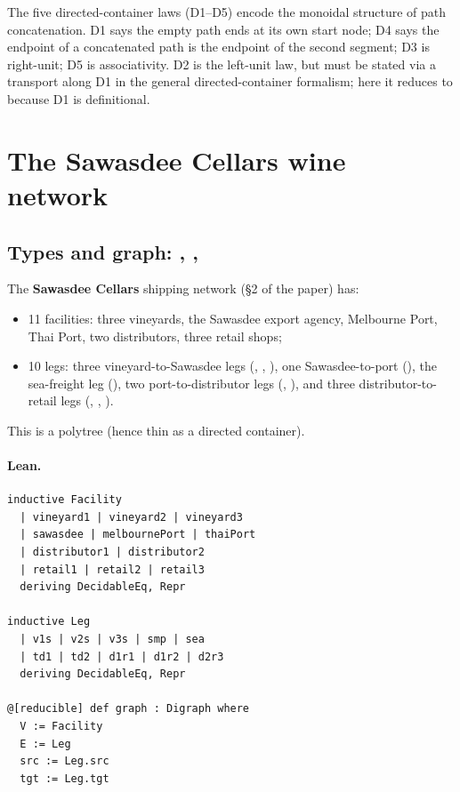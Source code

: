 \documentclass[11pt,a4paper]{article}
\begin{document}
\begin{fidelitynote}
The five directed-container laws (D1--D5) encode the monoidal structure of path
concatenation.  D1 says the empty path ends at its own start node; D4 says
the endpoint of a concatenated path is the endpoint of the second segment;
D3 is right-unit; D5 is associativity.  D2 is the left-unit law, but must be
stated via a transport along D1 in the general directed-container formalism;
here it reduces to  because D1 is definitional.
\end{fidelitynote}


\section{The Sawasdee Cellars wine network}

\subsection{Types and graph: , , }

\begin{defn}
The \textbf{Sawasdee Cellars} shipping network (\S2 of the paper) has:
\begin{itemize}
  \item 11 facilities: three vineyards, the Sawasdee export agency, Melbourne
    Port, Thai Port, two distributors, three retail shops;
  \item 10 legs: three vineyard-to-Sawasdee legs (, ,
    ), one Sawasdee-to-port (), the sea-freight leg
    (), two port-to-distributor legs (, ), and
    three distributor-to-retail legs (, , ).
\end{itemize}
This is a polytree (hence thin as a directed container).
\end{defn}

\paragraph{Lean.}
\begin{lstlisting}[style=lean]
inductive Facility
  | vineyard1 | vineyard2 | vineyard3
  | sawasdee | melbournePort | thaiPort
  | distributor1 | distributor2
  | retail1 | retail2 | retail3
  deriving DecidableEq, Repr

inductive Leg
  | v1s | v2s | v3s | smp | sea
  | td1 | td2 | d1r1 | d1r2 | d2r3
  deriving DecidableEq, Repr

@[reducible] def graph : Digraph where
  V := Facility
  E := Leg
  src := Leg.src
  tgt := Leg.tgt
\end{lstlisting}
\end{document}
